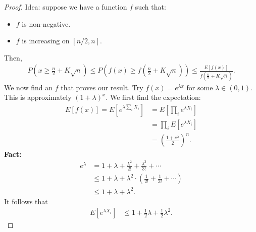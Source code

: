 \documentclass{report}
\begin{document}
\begin{proof}
    Idea: suppose we have a function $f$ such that:
    \begin{itemize}
        \item $f$ is non-negative.
        \item $f$ is increasing on $[n/2, n]$.
    \end{itemize}
    Then, 
    \begin{align*}
        P\left(x \geq \frac  n2 + K \sqrt n\right) \leq P\left(f(x) \geq f\left(\frac n2 + K \sqrt n\right)\right) \leq \frac{E[f(x)]}{f\left(\frac n2 + K \sqrt n\right)}. 
    \end{align*}
    \noindent We now find an $f$ that proves our result. Try $f(x) = e^{\lambda x}$ for some $\lambda \in (0, 1)$. This is approximately ${(1+\lambda)}^x$. We first find the expectation:
    \begin{align*}
        E[f(x)] = E[e^{\lambda \sum_i X_i}] &= E\left[\prod_i e^{\lambda X_i}\right] \\
        &= \prod_i E[e^{\lambda X_i}] \tag{by independence} \\
        &= \left( \frac{1 + e^\lambda}{2} \right)^n.
    \end{align*}
    \noindent \textbf{Fact:} \begin{align}
        e^\lambda &= 1 + \lambda + \frac{\lambda^2}{2!} + \frac{\lambda^3}{3!} + \cdots \\
        &\leq 1 + \lambda + \lambda^2 \cdot\left(\frac {1}{2!} + \frac {1}{3!} + \cdots \right) \\
        &\leq 1 + \lambda + \lambda^2.
    \end{align}
    It follows that
    \begin{align*}
        E[e^{\lambda X_i}] &\leq 1+ \frac 12 \lambda + \frac 12 \lambda^2.

\end{align*}
\end{proof}
\end{document}
